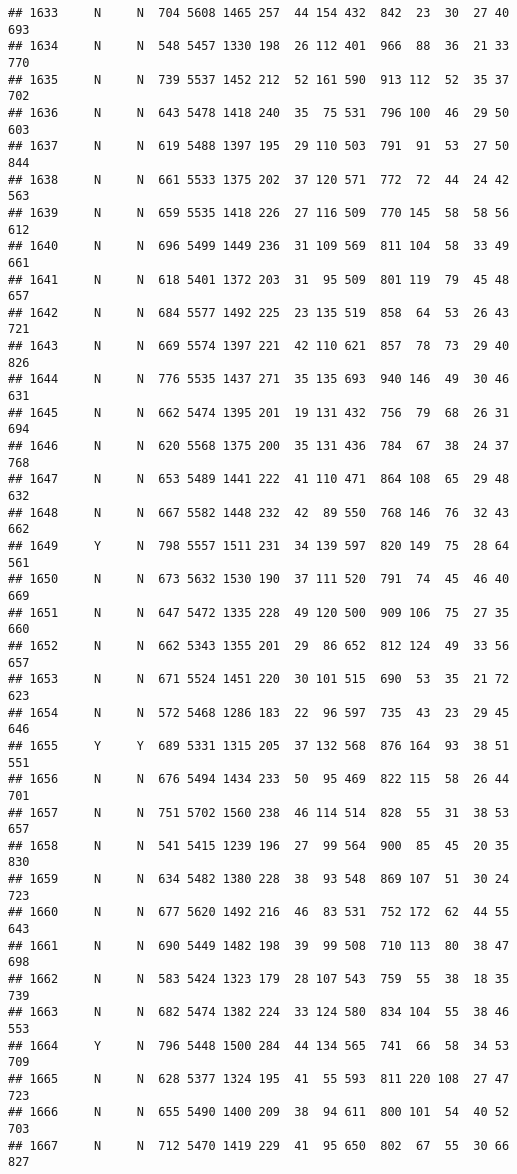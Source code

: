\documentclass[]{article}
\begin{document}
\begin{verbatim}
## 1633     N     N  704 5608 1465 257  44 154 432  842  23  30  27 40  693
## 1634     N     N  548 5457 1330 198  26 112 401  966  88  36  21 33  770
## 1635     N     N  739 5537 1452 212  52 161 590  913 112  52  35 37  702
## 1636     N     N  643 5478 1418 240  35  75 531  796 100  46  29 50  603
## 1637     N     N  619 5488 1397 195  29 110 503  791  91  53  27 50  844
## 1638     N     N  661 5533 1375 202  37 120 571  772  72  44  24 42  563
## 1639     N     N  659 5535 1418 226  27 116 509  770 145  58  58 56  612
## 1640     N     N  696 5499 1449 236  31 109 569  811 104  58  33 49  661
## 1641     N     N  618 5401 1372 203  31  95 509  801 119  79  45 48  657
## 1642     N     N  684 5577 1492 225  23 135 519  858  64  53  26 43  721
## 1643     N     N  669 5574 1397 221  42 110 621  857  78  73  29 40  826
## 1644     N     N  776 5535 1437 271  35 135 693  940 146  49  30 46  631
## 1645     N     N  662 5474 1395 201  19 131 432  756  79  68  26 31  694
## 1646     N     N  620 5568 1375 200  35 131 436  784  67  38  24 37  768
## 1647     N     N  653 5489 1441 222  41 110 471  864 108  65  29 48  632
## 1648     N     N  667 5582 1448 232  42  89 550  768 146  76  32 43  662
## 1649     Y     N  798 5557 1511 231  34 139 597  820 149  75  28 64  561
## 1650     N     N  673 5632 1530 190  37 111 520  791  74  45  46 40  669
## 1651     N     N  647 5472 1335 228  49 120 500  909 106  75  27 35  660
## 1652     N     N  662 5343 1355 201  29  86 652  812 124  49  33 56  657
## 1653     N     N  671 5524 1451 220  30 101 515  690  53  35  21 72  623
## 1654     N     N  572 5468 1286 183  22  96 597  735  43  23  29 45  646
## 1655     Y     Y  689 5331 1315 205  37 132 568  876 164  93  38 51  551
## 1656     N     N  676 5494 1434 233  50  95 469  822 115  58  26 44  701
## 1657     N     N  751 5702 1560 238  46 114 514  828  55  31  38 53  657
## 1658     N     N  541 5415 1239 196  27  99 564  900  85  45  20 35  830
## 1659     N     N  634 5482 1380 228  38  93 548  869 107  51  30 24  723
## 1660     N     N  677 5620 1492 216  46  83 531  752 172  62  44 55  643
## 1661     N     N  690 5449 1482 198  39  99 508  710 113  80  38 47  698
## 1662     N     N  583 5424 1323 179  28 107 543  759  55  38  18 35  739
## 1663     N     N  682 5474 1382 224  33 124 580  834 104  55  38 46  553
## 1664     Y     N  796 5448 1500 284  44 134 565  741  66  58  34 53  709
## 1665     N     N  628 5377 1324 195  41  55 593  811 220 108  27 47  723
## 1666     N     N  655 5490 1400 209  38  94 611  800 101  54  40 52  703
## 1667     N     N  712 5470 1419 229  41  95 650  802  67  55  30 66  827

\end{verbatim}
\end{document}

